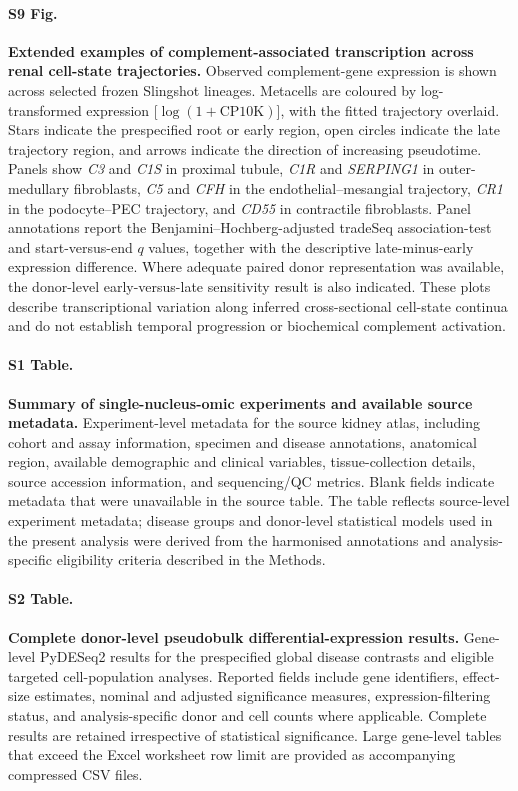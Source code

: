 \documentclass[10pt,letterpaper]{article}
\begin{document}
\paragraph*{S9 Fig.}
\label{S9_Fig}
\textbf{Extended examples of complement-associated transcription across renal cell-state trajectories.}
Observed complement-gene expression is shown across selected frozen Slingshot lineages. Metacells are coloured by log-transformed expression [$\log(1+\mathrm{CP10K})$], with the fitted trajectory overlaid. Stars indicate the prespecified root or early region, open circles indicate the late trajectory region, and arrows indicate the direction of increasing pseudotime. Panels show \textit{C3} and \textit{C1S} in proximal tubule, \textit{C1R} and \textit{SERPING1} in outer-medullary fibroblasts, \textit{C5} and \textit{CFH} in the endothelial--mesangial trajectory, \textit{CR1} in the podocyte--PEC trajectory, and \textit{CD55} in contractile fibroblasts. Panel annotations report the Benjamini--Hochberg-adjusted tradeSeq association-test and start-versus-end $q$ values, together with the descriptive late-minus-early expression difference. Where adequate paired donor representation was available, the donor-level early-versus-late sensitivity result is also indicated. These plots describe transcriptional variation along inferred cross-sectional cell-state continua and do not establish temporal progression or biochemical complement activation.

\paragraph*{S1 Table.}
\label{S1_Table}
\textbf{Summary of single-nucleus-omic experiments and available source metadata.}
Experiment-level metadata for the source kidney atlas, including cohort and assay information, specimen and disease annotations, anatomical region, available demographic and clinical variables, tissue-collection details, source accession information, and sequencing/QC metrics. Blank fields indicate metadata that were unavailable in the source table. The table reflects source-level experiment metadata; disease groups and donor-level statistical models used in the present analysis were derived from the harmonised annotations and analysis-specific eligibility criteria described in the Methods.

\paragraph*{S2 Table.}
\label{S2_Table}
\textbf{Complete donor-level pseudobulk differential-expression results.}
Gene-level PyDESeq2 results for the prespecified global disease contrasts and eligible targeted cell-population analyses. Reported fields include gene identifiers, effect-size estimates, nominal and adjusted significance measures, expression-filtering status, and analysis-specific donor and cell counts where applicable. Complete results are retained irrespective of statistical significance. Large gene-level tables that exceed the Excel worksheet row limit are provided as accompanying compressed CSV files.
\end{document}
